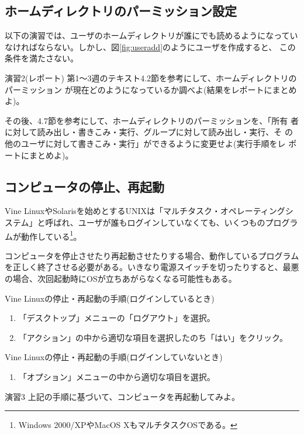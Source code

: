 \documentclass[a4j,10pt]{jarticle}
\begin{document}
\subsection{ホームディレクトリのパーミッション設定}
以下の演習では、ユーザのホームディレクトリが誰にでも読めるようになってい
なければならない。しかし、図\ref{fig:useradd}のようにユーザを作成すると、
この条件を満たさない。
\begin{itembox}{演習2(レポート)}
 第1〜3週のテキスト4.2節を参考にして、ホームディレクトリのパーミッション
 が現在どのようになっているか調べよ(結果をレポートにまとめよ)。

 その後、4.7節を参考にして、ホームディレクトリのパーミッションを、「所有
 者に対して読み出し・書きこみ・実行、グループに対して読み出し・実行、そ
 の他のユーザに対して書きこみ・実行」ができるように変更せよ(実行手順をレ
 ポートにまとめよ)。
\end{itembox}

\subsection{コンピュータの停止、再起動}
Vine LinuxやSolarisを始めとするUNIXは「マルチタスク・オペレーティングシ
ステム」と呼ばれ、ユーザが誰もログインしていなくても、いくつものプログラ
ムが動作している\footnote{Windows 2000/XPやMacOS XもマルチタスクOSである。}。

コンピュータを停止させたり再起動させたりする場合、動作しているプログラム
を正しく終了させる必要がある。いきなり電源スイッチを切ったりすると、最悪
の場合、次回起動時にOSが立ちあがらなくなる可能性もある。

\begin{screen}
 Vine Linuxの停止・再起動の手順(ログインしているとき)
 \begin{enumerate}
  \item 「デスクトップ」メニューの「ログアウト」を選択。
  \item 「アクション」の中から適切な項目を選択したのち「はい」をクリック。
 \end{enumerate}
 Vine Linuxの停止・再起動の手順(ログインしていないとき)
 \begin{enumerate}
  \item 「オプション」メニューの中から適切な項目を選択。
 \end{enumerate}
\end{screen}
\begin{itembox}{演習3}
 上記の手順に基づいて、コンピュータを再起動してみよ。
\end{itembox}
\end{document}

